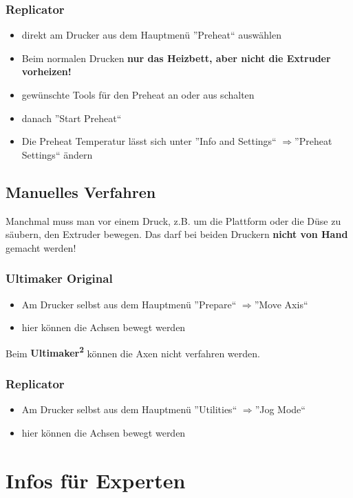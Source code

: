 \documentclass{\basedir/fablab-document}
\newcommand{\ts}[1]{\textsuperscript{#1}}
\newcommand{\ra}{$\Rightarrow$}
\begin{document}
\subsubsection{Replicator}
\begin{itemize}
 \item direkt am Drucker aus dem Hauptmenü ''Preheat`` auswählen
 \item Beim normalen Drucken \textbf{nur das Heizbett, aber nicht die Extruder vorheizen!}
 \item gewünschte Tools für den Preheat an oder aus schalten
 \item danach ''Start Preheat``
 \item Die Preheat Temperatur lässt sich unter ''Info and Settings`` \ra ''Preheat Settings`` ändern
\end{itemize}

\subsection{Manuelles Verfahren}\label{manuelles-verfahren}
Manchmal muss man vor einem Druck, z.B. um die Plattform oder die Düse zu säubern, den Extruder bewegen.
Das darf bei beiden Druckern \textbf{nicht von Hand} gemacht werden!

\subsubsection{Ultimaker Original}
\begin{itemize}
	\item Am Drucker selbst aus dem Hauptmenü ''Prepare`` \ra ''Move Axis``
	\item hier können die Achsen bewegt werden
\end{itemize}
Beim \textbf{Ultimaker\ts2} können die Axen nicht verfahren werden.

\subsubsection{Replicator}
\begin{itemize}
 \item Am Drucker selbst aus dem Hauptmenü ''Utilities`` \ra ''Jog Mode``
 \item hier können die Achsen bewegt werden
\end{itemize}


\section{Infos für Experten}
\end{document}

